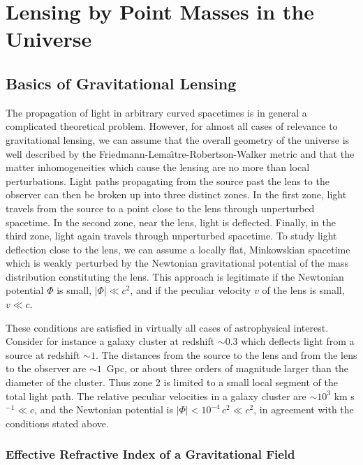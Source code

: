 \documentclass[a4paper,10pt]{article} %
\begin{document}
\section{Lensing by Point Masses in the Universe}
\label{NB:sect2}

\subsection{Basics of Gravitational Lensing}
\label{NB:subsect2.1}

The propagation of light in arbitrary curved spacetimes is in general
a complicated theoretical problem. However, for almost all cases of
relevance to gravitational lensing, we can assume that the overall
geometry of the universe is well described by the
Friedmann-Lema{\^\i}tre-Robertson-Walker metric and that the matter
inhomogeneities which cause the lensing are no more than local
perturbations. Light paths propagating from the source past the lens
to the observer can then be broken up into three distinct zones. In
the first zone, light travels from the source to a point close to the
lens through unperturbed spacetime. In the second zone, near the lens,
light is deflected. Finally, in the third zone, light again travels
through unperturbed spacetime. To study light deflection close to the
lens, we can assume a locally flat, Minkowskian spacetime which is
weakly perturbed by the Newtonian gravitational potential of the mass
distribution constituting the lens. This approach is legitimate if the
Newtonian potential $\Phi$ is small, $|\Phi|\ll c^2$, and if the
peculiar velocity $v$ of the lens is small, $v\ll c$.

These conditions are satisfied in virtually all cases of astrophysical
interest. Consider for instance a galaxy cluster at redshift $\sim0.3$
which deflects light from a source at redshift $\sim1$. The distances
from the source to the lens and from the lens to the observer are
$\sim1$~Gpc, or about three orders of magnitude larger than the
diameter of the cluster. Thus zone 2 is limited to a small local
segment of the total light path. The relative peculiar velocities in a
galaxy cluster are $\sim10^3$ km s$^{-1}\ll c$, and the Newtonian
potential is $|\Phi|<10^{-4}\,c^2\ll c^2$, in agreement with the
conditions stated above.

\subsubsection{Effective Refractive Index of a Gravitational Field}
\label{NB:subsubsect2.1.1}
\end{document}
